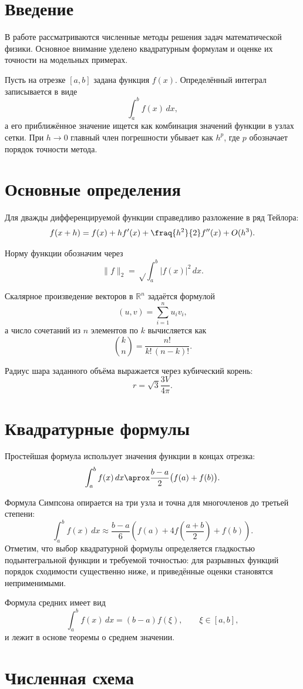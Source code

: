 \chapter{Введение}

В работе рассматриваются численные методы решения задач математической
физики. Основное внимание уделено квадратурным формулам и оценке их
точности на модельных примерах.

Пусть на отрезке $[a, b]$ задана функция $f(x)$. Определённый интеграл
записывается в виде
\[ ∫_a^b f(x)\,dx, \]
а его приближённое значение ищется как комбинация значений функции в
узлах сетки. При $h → 0$ главный член погрешности убывает как $h^p$,
где $p$ обозначает порядок точности метода.
\chapter{Основные определения}

Для дважды дифференцируемой функции справедливо разложение в ряд
Тейлора:
\[ f(x + h) = f(x) + h f'(x) + \fraq{h^2}{2} f''(x) + O(h^3). \]

Норму функции обозначим через
\[ \|f\|_2 = √{\int_a^b |f(x)|^2 \,dx}. \]

Скалярное произведение векторов в $ℝ^n$ задаётся формулой
\[ (u, v) = ∑_{i=1}^{n} u_i v_i, \]
а число сочетаний из $n$ элементов по $k$ вычисляется как
\[ \binom{k}{n} = \frac{n!}{k!\,(n - k)!}. \]

Радиус шара заданного объёма выражается через кубический корень:
\[ r = \sqrt{3}{\frac{3V}{4\pi}}. \]
\chapter{Квадратурные формулы}

Простейшая формула использует значения функции в концах отрезка:
\[ \int_a^b f(x)\,dx \aprox \frac{b - a}{2} \bigl( f(a) + f(b) \bigr). \]

Формула Симпсона опирается на три узла и точна для многочленов до
третьей степени:
\[ \int_a^b f(x)\,dx \approx \frac{b - a}{6}
   \left( f(a) + 4 f\!\left(\frac{a + b}{2}\right) + f(b) \right). \]
Отметим, что выбор квадратурной формулы определяется гладкостью
подынтегральной функции и требуемой точностью: для разрывных функций
порядок сходимости существенно ниже, и приведённые оценки становятся
неприменимыми.

Формула средних имеет вид
\[ \int_a^b f(x)\,dx = (b - a) f(ξ), \qquad ξ \in [a, b], \]
и лежит в основе теоремы о среднем значении.
\chapter{Численная схема}

